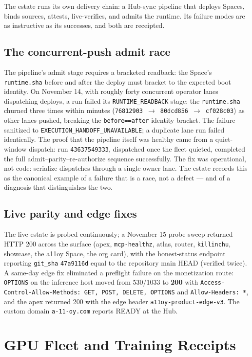 The estate runs its own delivery chain: a Hub-sync pipeline that deploys Spaces, binds sources, attests, live-verifies, and admits the runtime. Its failure modes are as instructive as its successes, and both are receipted.

\subsection{The concurrent-push admit race}
The pipeline's admit stage requires a bracketed readback: the Space's \texttt{runtime.sha} before and after the deploy must bracket to the expected boot identity. On November 14, with roughly forty concurrent operator lanes dispatching deploys, a run failed its \texttt{RUNTIME\_READBACK} stage: the \texttt{runtime.sha} churned three times within minutes (\texttt{76812903}~$\to$~\texttt{80dcd856}~$\to$~\texttt{cf028c03}) as other lanes pushed, breaking the \texttt{before==after} identity bracket. The failure sanitized to \texttt{EXECUTION\_HANDOFF\_UNAVAILABLE}; a duplicate lane run failed identically. The proof that the pipeline itself was healthy came from a quiet-window dispatch: run \texttt{43637549333}, dispatched once the fleet quieted, completed the full admit--parity--re-authorize sequence successfully. The fix was operational, not code: serialize dispatches through a single owner lane. The estate records this as the canonical example of a failure that is a race, not a defect --- and of a diagnosis that distinguishes the two.

\subsection{Live parity and edge fixes}
The live estate is probed continuously; a November 15 probe sweep returned HTTP 200 across the surface (apex, \texttt{mcp-healthz}, atlas, router, \texttt{killinchu}, showcase, the a11oy Space, the org card), with the honest-status endpoint reporting \texttt{git\_sha} \texttt{47a9116d} equal to the repository main HEAD (verified twice). A same-day edge fix eliminated a preflight failure on the monetization route: \texttt{OPTIONS} on the inference host moved from 530/1033 to \textbf{200} with \texttt{Access-Control-Allow-Methods: GET, POST, DELETE, OPTIONS} and \texttt{Allow-Headers: *}, and the apex returned 200 with the edge header \texttt{a11oy-product-edge-v3}. The custom domain \texttt{a-11-oy.com} reports READY at the Hub.

\section{GPU Fleet and Training Receipts}
\label{sec:fleet}

